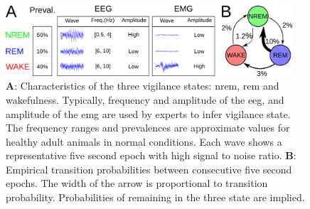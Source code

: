 \begin{figure}[h!]
  \centering   
    \includegraphics[width=0.95\textwidth]{figures/sleep_description.pdf}
  \caption{
  \textbf{A}: Characteristics of the three vigilance states: \gls{nrem}, \gls{rem} and wakefulness.
  Typically, frequency and amplitude of the \acrfull{eeg}, and amplitude of the \acrfull{emg} are used by experts to infer vigilance state.
  The frequency ranges and prevalences are approximate values for healthy adult animals in normal conditions.
  Each wave shows a representative five second epoch with high signal to noise ratio.
  \textbf{B}: Empirical transition probabilities between consecutive five second epochs. The width of the arrow is proportional to transition probability.
  Probabilities of remaining in the three state are implied.
  \label{fig:sleep_description}
  }
\end{figure}


